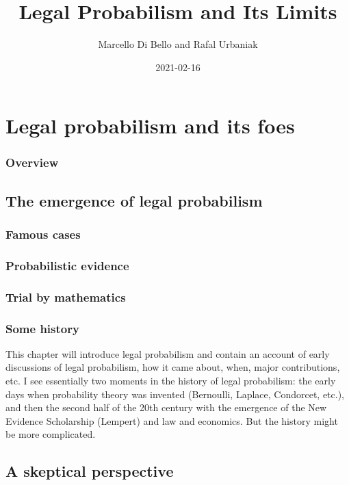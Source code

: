 \documentclass[]{book}
\title{Legal Probabilism and Its Limits}
\author{Marcello Di Bello and Rafal Urbaniak}
\date{2021-02-16}
\begin{document}
\maketitle

{
\setcounter{tocdepth}{1}
\tableofcontents
}
\part{Legal probabilism and its foes}

\section*{Overview}

\chapter{The emergence of legal probabilism}

\section{Famous cases}

\section{Probabilistic evidence}

\section{Trial by mathematics}

\section{Some history}

This chapter will introduce legal probabilism and contain an account of early\\
discussions of legal probabilism, how
it came about, when, major contributions, etc.
I see essentially two moments in
the history of legal probabilism: the early days when probability
theory was invented (Bernoulli, Laplace, Condorcet, etc.), and then
the second half of the 20th century with the emergence
of the New Evidence Scholarship (Lempert)
and law and economics. But the history
might be more complicated.

\chapter{A skeptical perspective}
\end{document}
